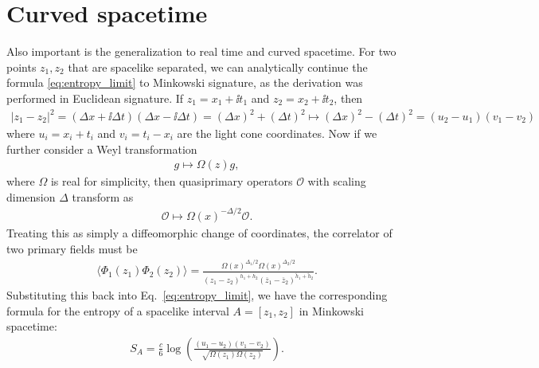 \section{Curved spacetime}
Also important is the generalization to real time and curved spacetime. For two points $z_1, z_2$
that are spacelike separated, 
we can analytically continue
the formula \eqref{eq:entropy_limit} to Minkowski signature, as the derivation was
performed in Euclidean signature. If $z_1 = x_1 + \ii t_1$ and $z_2 = x_2 + \ii
t_2$, then
\begin{align}
  |z_1-z_2|^2 = (\Delta x + \ii \Delta t)(\Delta x - \ii \Delta t) = (\Delta x)^2 + (\Delta t)^2 \mapsto (\Delta x)^2 - (\Delta t)^2 = (u_2 - u_1)(v_1 - v_2)
\end{align}
where $u_i = x_i + t_i$ and $v_i = t_i - x_i$ are the light cone coordinates.
Now if we further consider a Weyl transformation
\begin{align}
g \mapsto \Omega(z)g,
\end{align}
where $\Omega$ is real for simplicity,
then quasiprimary operators $\mathcal O$ with scaling dimension $\Delta$
transform as
\begin{align}
  \mathcal O \mapsto \Omega(x)^{-\Delta/2}\mathcal O.
\end{align}
Treating this as simply a diffeomorphic change of coordinates, the correlator of
two primary fields must be
\begin{align}
\langle \Phi_1(z_1)\Phi_2(z_2) \rangle = \frac{\Omega(x)^{\Delta_1/2}\Omega(x)^{\Delta_2/2}}{(z_1-z_2)^{h_1+h_2}(\overline z_1 - \overline z_2)^{\tilde h_1 + \tilde h_2}}.
\end{align}
Substituting this back into Eq.~\eqref{eq:entropy_limit}, we have the
corresponding formula for the entropy of a spacelike interval $A = [z_1,
z_2]$ in Minkowski spacetime:
\begin{align}
S_A = \frac{c}{6}\log(\frac{(u_1 - u_2)(v_1-v_2)}{\sqrt{\Omega(z_1)\Omega(z_2)}}). \label{eq:curved-spacetime}
\end{align}




